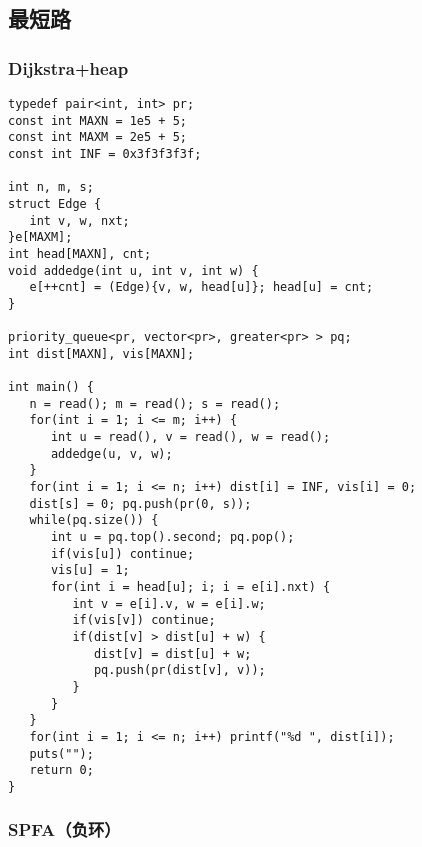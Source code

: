 \documentclass{article}
\begin{document}
    \subsection{最短路}

    \subsubsection{Dijkstra+heap}

\begin{lstlisting}
typedef pair<int, int> pr;
const int MAXN = 1e5 + 5;
const int MAXM = 2e5 + 5;
const int INF = 0x3f3f3f3f;

int n, m, s;
struct Edge {
   int v, w, nxt;
}e[MAXM];
int head[MAXN], cnt;
void addedge(int u, int v, int w) {
   e[++cnt] = (Edge){v, w, head[u]}; head[u] = cnt;
}

priority_queue<pr, vector<pr>, greater<pr> > pq;
int dist[MAXN], vis[MAXN];

int main() {
   n = read(); m = read(); s = read();
   for(int i = 1; i <= m; i++) {
      int u = read(), v = read(), w = read();
      addedge(u, v, w);
   }
   for(int i = 1; i <= n; i++) dist[i] = INF, vis[i] = 0;
   dist[s] = 0; pq.push(pr(0, s));
   while(pq.size()) {
      int u = pq.top().second; pq.pop();
      if(vis[u]) continue;
      vis[u] = 1;
      for(int i = head[u]; i; i = e[i].nxt) {
         int v = e[i].v, w = e[i].w;
         if(vis[v]) continue;
         if(dist[v] > dist[u] + w) {
            dist[v] = dist[u] + w;
            pq.push(pr(dist[v], v));
         }
      }
   }
   for(int i = 1; i <= n; i++) printf("%d ", dist[i]);
   puts("");
   return 0;
}
\end{lstlisting}

    \subsubsection{SPFA（负环）}
\end{document}

